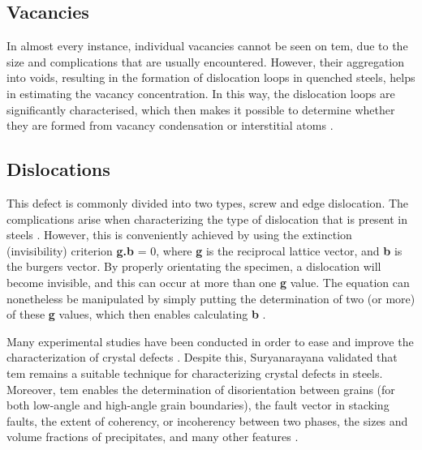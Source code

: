 \subsection{Vacancies} 
 In almost every instance, individual vacancies cannot be seen on \acrshort{tem}, due to the size and complications that are usually encountered. However, their aggregation into voids, resulting in the formation of dislocation loops in quenched steels, helps in estimating the vacancy concentration. In this way, the dislocation loops are significantly characterised, which then makes it possible to determine whether they are formed from vacancy condensation or interstitial atoms \cite{suryanarayana2017microstructure}.

\subsection{Dislocations}   
This defect is commonly divided into two types, screw and edge dislocation. The complications arise when characterizing the type of dislocation that is present in steels \cite{jones2012engineering}. However, this is conveniently achieved by using the extinction (invisibility) criterion \textbf{g.b} = 0, where \textbf{g} is the reciprocal lattice vector, and \textbf{b} is the burgers vector. By properly orientating the specimen, a dislocation will become invisible, and this can occur at more than one \textbf{g} value. The equation can nonetheless be manipulated by simply putting the determination of two (or more) of these \textbf{g} values, which then enables calculating \textbf{b} \cite{suryanarayana2017microstructure}. 

Many experimental studies have been conducted in order to ease and improve the characterization of crystal defects \cite{george2002introduction, bhadeshia2017steels, karayan2014weld}. Despite this, Suryanarayana \cite{suryanarayana2017microstructure} validated that \acrshort{tem} remains a suitable technique for characterizing crystal defects in steels. Moreover, \acrshort{tem} enables the determination of disorientation between grains (for both low-angle and high-angle grain boundaries), the fault vector in stacking faults, the extent of coherency, or incoherency between two phases, the sizes and volume fractions of precipitates, and many other features \cite{suryanarayana2017microstructure}.

